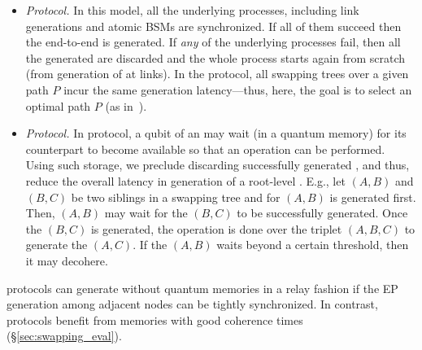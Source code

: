 \begin{itemize}
\item \textit{\os Protocol.}  
In this model, all the underlying processes, including link \eps generations and atomic
BSMs are synchronized. If all of them succeed then the end-to-end \eps is generated.
If \textit{any} of the underlying processes fail,
then all the generated \epss are discarded and the
whole process starts again from scratch (from generation of \eps at links).
In the \os protocol, all swapping trees over a given path $P$
incur the same generation latency---thus, here, the
goal is to select an optimal path $P$ (as in~\cite{sigcomm20,delft-lp}).   

\item \textit{\wt Protocol.} In \wt protocol, a qubit of an \eps 
may wait (in a quantum memory) for its counterpart to become available so that an \es operation can be performed. 
Using such storage, we preclude discarding successfully generated \epss, and 
thus, reduce the overall latency in generation of a root-level \eps. 
E.g., let  $(A,B)$ and $(B,C)$ be two siblings in a swapping tree and \eps for $(A,B)$ is generated first. Then, \eps $(A,B)$ may wait for the \eps $(B,C)$ to be successfully generated. 
Once the \eps $(B,C)$ is generated, the \es operation
is done over the triplet $(A, B, C)$ to generate the \eps $(A,C)$. 
If the \eps $(A,B)$ waits beyond a certain threshold, then it may decohere.   
\end{itemize}

\os protocols can generate \epss without quantum memories in a relay fashion if 
the EP generation among adjacent nodes can be tightly synchronized. In contrast,
\wt protocols benefit from memories with good coherence times (\S\ref{sec:swapping_eval}).

